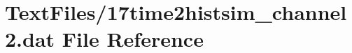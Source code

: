 \hypertarget{17time2histsim__channel2_8dat}{}\section{Text\+Files/17time2histsim\+\_\+channel2.dat File Reference}
\label{17time2histsim__channel2_8dat}
